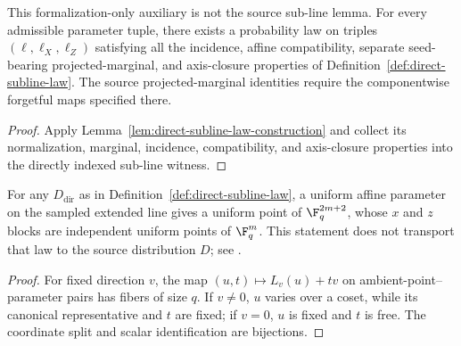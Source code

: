 \begin{lemma}
	\label{lem:direct-subline-witness-exists}
	\leanok
	This formalization-only auxiliary is not the source sub-line lemma. For every
	admissible parameter tuple, there exists a probability law on
	triples $(\ell,\ell_X,\ell_Z)$ satisfying all the incidence, affine
	compatibility, separate seed-bearing projected-marginal, and axis-closure
	properties of Definition~\ref{def:direct-subline-law}. The source
	projected-marginal identities require the componentwise forgetful maps
	specified there.
\end{lemma}
\begin{proof}
	\leanok
	Apply Lemma~\ref{lem:direct-subline-law-construction} and collect its
	normalization, marginal, incidence, compatibility, and axis-closure
	properties into the directly indexed sub-line witness.
\end{proof}

\begin{lemma}
	\label{lem:qld-sublines-uniform-point}
	\leanok
	For any $D_{\mathrm{dir}}$ as in Definition~\ref{def:direct-subline-law},
	a uniform affine parameter on the sampled extended line gives a uniform
	point of $\F_q^{2m+2}$, whose $x$ and $z$ blocks are independent uniform
	points of $\F_q^m$. This statement does not transport that law to the
	source distribution $D$; see \cite{gap:qpbt_ld-dimension-divisibility}.
\end{lemma}
\begin{proof}
	\leanok
	For fixed direction $v$, the map $(u,t)\mapsto L_v(u)+tv$ on
	ambient-point--parameter pairs has fibers of size $q$. If $v\ne0$,
	$u$ varies over a coset, while its canonical representative and $t$ are
	fixed; if $v=0$, $u$ is fixed and $t$ is free. The coordinate split and
	scalar identification are bijections.
\end{proof}

